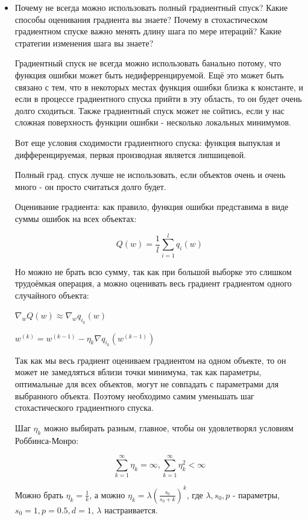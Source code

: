 \documentclass[12pt]{article}
\begin{document}
\begin{itemize}
\begin{itemize}
\end{itemize}

\item  Почему не всегда можно использовать полный градиентный спуск? Какие способы
оценивания градиента вы знаете? Почему в стохастическом градиентном спуске важно
менять длину шага по мере итераций? Какие стратегии изменения шага вы знаете?

Градиентный спуск не всегда можно использовать банально потому, что функция ошибки может быть недиферренцируемой.
Ещё это может быть связано с тем, что в некоторых местах функция ошибки близка к константе, и если в процессе градиентного спуска прийти в эту область, то он будет очень долго сходиться. Также градиентный спуск может не сойтись, если у нас сложная поверхность функции ошибки - несколько локальных минимумов.

Вот еще условия сходимости градиентного спуска: функция выпуклая и дифференцируемая, первая производная является липшицевой.

Полный град. спуск лучше не использовать, если объектов очень и очень много - он просто считаться долго будет.

Оценивание градиента:
как правило, функция ошибки представима в виде суммы ошибок на всех объектах:

\[ Q(w) = \frac{1}{l} \sum_{i=1}^l q_i(w) \]

Но можно не брать всю сумму, так как при большой выборке это слишком трудоёмкая операция, а можно оценивать весь градиент градиентом одного случайного объекта:

$\nabla_w Q(w) \approx \nabla_w q_{i_k} (w)$

$w^{(k)} = w^{(k-1)} - \eta_k \nabla q_{i_k} ( w^{(k-1)} ) $

Так как мы весь градиент оцениваем градиентом на одном объекте, то он может не замедляться вблизи точки минимума, так как параметры, оптимальные для всех объектов, могут не совпадать с параметрами для выбранного объекта. Поэтому необходимо самим уменьшать шаг стохастического градиентного спуска.

Шаг $\eta_k$ можно выбирать разным, главное, чтобы он удовлетворял условиям Роббинса-Монро:

\[ \sum_{k=1}^\infty \eta_k = \infty, \sum_{k=1}^\infty \eta_k^2 < \infty \]

Можно брать $\eta_k = \frac{1}{k}$, а можно $\eta_k = \lambda \left( \frac{s_0}{s_0+k} \right) ^k$, где $\lambda, s_0, p$ - параметры, $s_0 = 1, p = 0.5, d = 1$, $\lambda$ настраивается.


\end{itemize}
\end{document}

